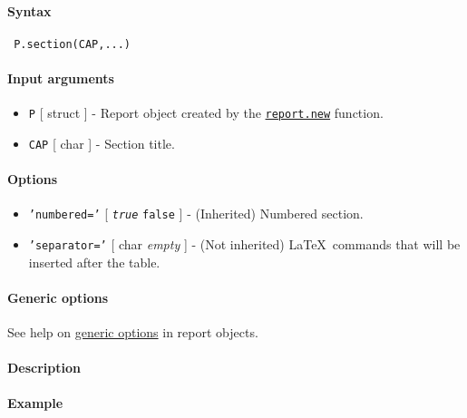 


	\paragraph{Syntax}
 
 \begin{verbatim}
 P.section(CAP,...)
 \end{verbatim}
 
 \paragraph{Input arguments}
 
 \begin{itemize}
 \item
   \texttt{P} {[} struct {]} - Report object created by the
   \href{report/new}{\texttt{report.new}} function.
 \item
   \texttt{CAP} {[} char {]} - Section title.
 \end{itemize}
 
 \paragraph{Options}
 
 \begin{itemize}
 \item
   \texttt{'numbered='} {[} \emph{\texttt{true}} \textbar{}
   \texttt{false} {]} - (Inherited) Numbered section.
 \item
   \texttt{'separator='} {[} char \textbar{} \emph{empty} {]} - (Not
   inherited) \LaTeX~commands that will be inserted after the table.
 \end{itemize}
 
 \paragraph{Generic options}
 
 See help on \href{report/Contents}{generic options} in report objects.
 
 \paragraph{Description}
 
 \paragraph{Example}


